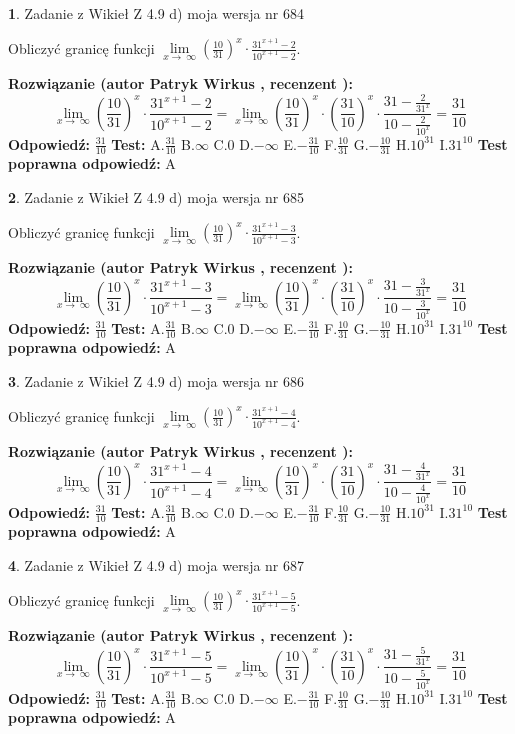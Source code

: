 \documentclass[12pt, a4paper]{article}
\theoremstyle{definition} %
\newtheorem{zad}{}
\newcommand{\zadStart}[1]{\begin{zad}#1\newline}
\newcommand{\zadStop}{\end{zad}}
\newcommand{\rozwStart}[2]{\noindent \textbf{Rozwiązanie (autor #1 , recenzent #2): }\newline}
\newcommand{\rozwStop}{\newline}
\newcommand{\odpStart}{\noindent \textbf{Odpowiedź:}\newline}
\newcommand{\odpStop}{\newline}
\newcommand{\testStart}{\noindent \textbf{Test:}\newline}
\newcommand{\testStop}{\newline}
\newcommand{\kluczStart}{\noindent \textbf{Test poprawna odpowiedź:}\newline}
\newcommand{\kluczStop}{\newline}
\begin{document}
\zadStart{Zadanie z Wikieł Z 4.9 d) moja wersja nr 684}


Obliczyć granicę funkcji  $\lim\limits_{x\to\ \infty}(\frac{10}{31})^{x}\cdot\frac{31^{x+1}-2}{10^{x+1}-2}$.
\zadStop
\rozwStart{Patryk Wirkus}{}
$$\lim\limits_{x\to\ \infty}(\frac{10}{31})^{x}\cdot\frac{31^{x+1}-2}{10^{x+1}-2}=\lim\limits_{x\to\ \infty}(\frac{10}{31})^{x}\cdot(\frac{31}{10})^{x} \cdot \frac{31-\frac{2}{31^{x}}}{10-\frac{2}{10^{x}}} = \frac{31}{10}$$
\rozwStop
\odpStart
$\frac{31}{10}$
\odpStop
\testStart
A.$\frac{31}{10}$ B.$\infty$ C.$0$ D.$-\infty$ E.$-\frac{31}{10}$
F.$\frac{10}{31}$ G.$-\frac{10}{31}$
H.$10^{31}$
I.$31^{10}$
\testStop
\kluczStart
A
\kluczStop



\zadStart{Zadanie z Wikieł Z 4.9 d) moja wersja nr 685}


Obliczyć granicę funkcji  $\lim\limits_{x\to\ \infty}(\frac{10}{31})^{x}\cdot\frac{31^{x+1}-3}{10^{x+1}-3}$.
\zadStop
\rozwStart{Patryk Wirkus}{}
$$\lim\limits_{x\to\ \infty}(\frac{10}{31})^{x}\cdot\frac{31^{x+1}-3}{10^{x+1}-3}=\lim\limits_{x\to\ \infty}(\frac{10}{31})^{x}\cdot(\frac{31}{10})^{x} \cdot \frac{31-\frac{3}{31^{x}}}{10-\frac{3}{10^{x}}} = \frac{31}{10}$$
\rozwStop
\odpStart
$\frac{31}{10}$
\odpStop
\testStart
A.$\frac{31}{10}$ B.$\infty$ C.$0$ D.$-\infty$ E.$-\frac{31}{10}$
F.$\frac{10}{31}$ G.$-\frac{10}{31}$
H.$10^{31}$
I.$31^{10}$
\testStop
\kluczStart
A
\kluczStop



\zadStart{Zadanie z Wikieł Z 4.9 d) moja wersja nr 686}


Obliczyć granicę funkcji  $\lim\limits_{x\to\ \infty}(\frac{10}{31})^{x}\cdot\frac{31^{x+1}-4}{10^{x+1}-4}$.
\zadStop
\rozwStart{Patryk Wirkus}{}
$$\lim\limits_{x\to\ \infty}(\frac{10}{31})^{x}\cdot\frac{31^{x+1}-4}{10^{x+1}-4}=\lim\limits_{x\to\ \infty}(\frac{10}{31})^{x}\cdot(\frac{31}{10})^{x} \cdot \frac{31-\frac{4}{31^{x}}}{10-\frac{4}{10^{x}}} = \frac{31}{10}$$
\rozwStop
\odpStart
$\frac{31}{10}$
\odpStop
\testStart
A.$\frac{31}{10}$ B.$\infty$ C.$0$ D.$-\infty$ E.$-\frac{31}{10}$
F.$\frac{10}{31}$ G.$-\frac{10}{31}$
H.$10^{31}$
I.$31^{10}$
\testStop
\kluczStart
A
\kluczStop



\zadStart{Zadanie z Wikieł Z 4.9 d) moja wersja nr 687}


Obliczyć granicę funkcji  $\lim\limits_{x\to\ \infty}(\frac{10}{31})^{x}\cdot\frac{31^{x+1}-5}{10^{x+1}-5}$.
\zadStop
\rozwStart{Patryk Wirkus}{}
$$\lim\limits_{x\to\ \infty}(\frac{10}{31})^{x}\cdot\frac{31^{x+1}-5}{10^{x+1}-5}=\lim\limits_{x\to\ \infty}(\frac{10}{31})^{x}\cdot(\frac{31}{10})^{x} \cdot \frac{31-\frac{5}{31^{x}}}{10-\frac{5}{10^{x}}} = \frac{31}{10}$$
\rozwStop
\odpStart
$\frac{31}{10}$
\odpStop
\testStart
A.$\frac{31}{10}$ B.$\infty$ C.$0$ D.$-\infty$ E.$-\frac{31}{10}$
F.$\frac{10}{31}$ G.$-\frac{10}{31}$
H.$10^{31}$
I.$31^{10}$
\testStop
\kluczStart
A
\kluczStop
\end{document}

